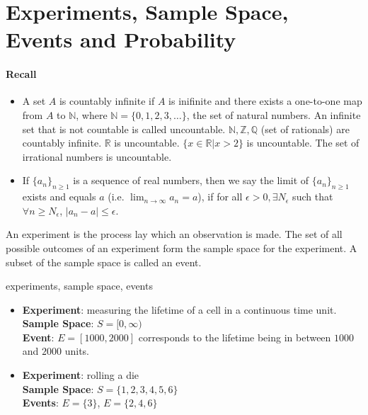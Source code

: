 \section{Experiments, Sample Space, Events and Probability}
\paragraph{Recall}
\begin{itemize}[noitemsep,topsep=0pt]
    \item
    A set $A$ is countably infinite if $A$ is inifinite and there exists
a one-to-one map from $A$ to $\mathbb{N}$, where $\mathbb{N} = \lbrace 0, 1,
2, 3, \dots \rbrace$, the set of natural numbers. An infinite set that is not
countable is called uncountable. $\mathbb{N}, \mathbb{Z}, \mathbb{Q}$ (set of
rationals) are countably infinite. $\mathbb{R}$ is uncountable. $\lbrace x
\in \mathbb{R} \vert x > 2 \rbrace$ is uncountable. The set of irrational
numbers is uncountable.
    \item
    If $\lbrace a_n \rbrace_{n \geq 1}$ is a sequence of real numbers, then we
say the limit of $\lbrace a_n \rbrace_{n \geq 1}$ exists and equals $a$ (i.e. $
\lim_{n \rightarrow \infty} a_n = a$), if for all $\epsilon > 0, \exists
N_\epsilon$ such that $\forall n \geq N_\epsilon$, $\vert a_n - a \vert
\leq \epsilon$.
\end{itemize}

\begin{definition}
    An experiment is the process lay which an observation is made. The set of
all possible outcomes of an experiment form the sample space for the
experiment. A subset of the sample space is called an event.
\end{definition}

\begin{example}
experiments, sample space, events
\begin{itemize}[noitemsep,topsep=0pt]
    \item
    \textbf{Experiment}:
        measuring the lifetime of a cell in a continuous time unit.          \\
    \textbf{Sample Space}: $S = [0, \infty)$                                 \\
    \textbf{Event}:
        $E = [1000, 2000]$ corresponds to the lifetime being in between $1000$
        and $2000$ units.                                                    \\
    \item
    \textbf{Experiment}:
        rolling a die                                                        \\
    \textbf{Sample Space}: $S = \lbrace 1, 2, 3, 4, 5, 6 \rbrace$            \\
    \textbf{Events}: $E = \lbrace 3 \rbrace$, $E = \lbrace 2, 4, 6 \rbrace$
\end{itemize}
\end{example}

